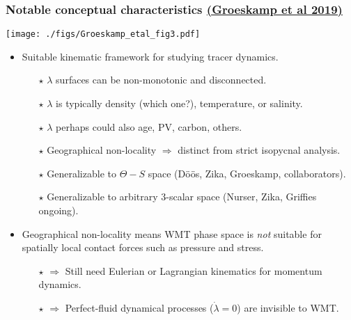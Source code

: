 \documentclass[10pt]{beamer}
\begin{document}
\begin{frame}
  \frametitle{Notable conceptual characteristics
\small \href{https://www.annualreviews.org/doi/abs/10.1146/annurev-marine-010318-095421}{(Groeskamp et al 2019)}
}

\begin{center}
\vspace{-.1cm}
{\texttt{[image: ./figs/Groeskamp\_etal\_fig3.pdf]}}
\end{center}
\vspace{-.3cm}

\begin{exampleblock}{}
\begin{itemize}

\item  Suitable kinematic framework for studying tracer dynamics. 
 \begin{itemize}
 \footnotesize 
   \item[$\star$] $\lambda$ surfaces can be non-monotonic and disconnected.
   \item[$\star$] $\lambda$ is typically density (which one?), temperature, or salinity. 
   \item[$\star$]  $\lambda$ perhaps could also age, PV, carbon, others.  
   \item[$\star$] Geographical non-locality $\Longrightarrow$ distinct from strict isopycnal analysis.
   \item[$\star$] Generalizable to $\Theta-S$ space ({D\"{o}\"{o}s},
     Zika, Groeskamp, collaborators).
   \item[$\star$] Generalizable to arbitrary 3-scalar space (Nurser,
     Zika, Griffies ongoing).
 \end{itemize}

\item Geographical non-locality means WMT phase space is {\it not}
  suitable for spatially local contact forces such as pressure and
  stress.
\begin{itemize}
 \footnotesize 
\item[$\star$] $\Longrightarrow$ Still need Eulerian or Lagrangian
  kinematics for momentum dynamics.
\item[$\star$] $\Longrightarrow$ Perfect-fluid dynamical processes
  ($\dot{\lambda} = 0$) are invisible to WMT.
\end{itemize}

\end{itemize}
\end{exampleblock}{}

\end{frame}
\end{document}
